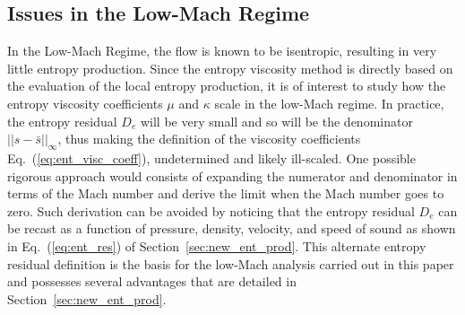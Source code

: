 \documentclass[preprint,10pt]{elsarticle}
\newcommand{\eqt}[1]{Eq.~(\ref{#1})}                     %
\newcommand{\sct}[1]{Section~\ref{#1}}                   %
\begin{document}
\subsection{Issues in the Low-Mach Regime} 

In the Low-Mach Regime, the flow is known to be isentropic, resulting in very little entropy production. Since the entropy viscosity method is directly based on the evaluation of the local entropy production, it is of interest to study how the entropy viscosity coefficients $\mu$ and $\kappa$ scale in the low-Mach regime. In practice, the entropy residual $D_e$ will be very small and so will be the denominator $|| s - \bar{s} ||_\infty$, thus making the definition of the viscosity coefficients \eqt{eq:ent_visc_coeff}, undetermined and likely ill-scaled.  One possible rigorous approach would consists of expanding the numerator and denominator in terms of the Mach number and derive the limit when the Mach number goes to zero. Such derivation can be avoided by noticing that the entropy residual $D_e$ can be recast as a function of pressure, density, velocity, and speed of sound as shown in \eqt{eq:ent_res} of \sct{sec:new_ent_prod}. This alternate entropy residual definition is the basis for the low-Mach analysis carried out in this paper and possesses several advantages that are detailed in \sct{sec:new_ent_prod}.

\end{document}
